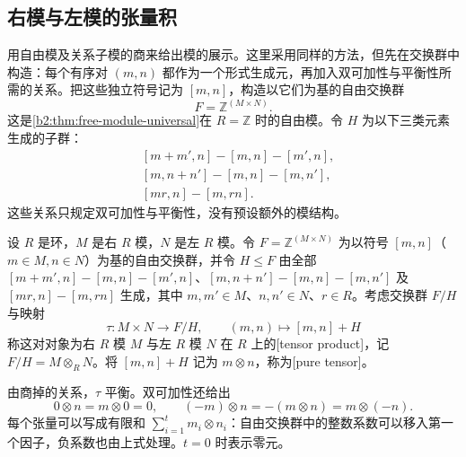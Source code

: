 \subsection{右模与左模的张量积}
\label{b2:subsec:0601:02}

用自由模及关系子模的商来给出模的展示。这里采用同样的方法，但先在交换群中构造：每个有序对 \((m,n)\) 都作为一个形式生成元，再加入双可加性与平衡性所需的关系。把这些独立符号记为 \([m,n]\)，构造以它们为基的自由交换群
\[
	F=\mathbb Z^{(M\times N)}.
\]
这是\cref{b2:thm:free-module-universal}在 \(R=\mathbb Z\) 时的自由模。令 \(H\) 为以下三类元素生成的子群：
\[
	\begin{aligned}
		&[m+m',n]-[m,n]-[m',n],\\
		&[m,n+n']-[m,n]-[m,n'],\\
		&[mr,n]-[m,rn].
	\end{aligned}
\]
这些关系只规定双可加性与平衡性，没有预设额外的模结构。

\begin{definition}\label{b2:def:tensor-product}
	设 \(R\) 是环，\(M\) 是右 \(R\) 模，\(N\) 是左 \(R\) 模。令 \(F=\mathbb Z^{(M\times N)}\) 为以符号 \([m,n]\)（\(m\in M,n\in N\)）为基的自由交换群，并令 \(H\le F\) 由全部 \([m+m',n]-[m,n]-[m',n]\)、\([m,n+n']-[m,n]-[m,n']\) 及 \([mr,n]-[m,rn]\) 生成，其中 \(m,m'\in M\)、\(n,n'\in N\)、\(r\in R\)。考虑交换群 \(F/H\) 与映射
	\[
		\tau:M\times N\longrightarrow F/H,\qquad (m,n)\longmapsto[m,n]+H
	\]
	称这对对象为右 \(R\) 模 \(M\) 与左 \(R\) 模 \(N\) 在 \(R\) 上的[tensor product]，记 \(F/H=M\otimes_R N\)。将 \([m,n]+H\) 记为 \(m\otimes n\)，称为[pure tensor]。
\end{definition}

由商掉的关系，\(\tau\) 平衡。双可加性还给出
\[
	0\otimes n=m\otimes0=0,\qquad (-m)\otimes n=-(m\otimes n)=m\otimes(-n).
\]
每个张量可以写成有限和 \(\sum_{i=1}^t m_i\otimes n_i\)：自由交换群中的整数系数可以移入第一个因子，负系数也由上式处理。\(t=0\) 时表示零元。

